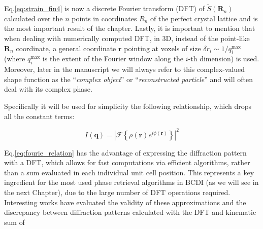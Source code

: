 
Eq.\ref{eq:strain_fin4} is now a discrete Fourier transform (DFT) of $\tilde{S}(\mathbf{R}_n)$ calculated over the $n$ 
points in coordinates $R_n$ of the perfect crystal lattice and is the most important result of the chapter. 
Lastly, it is important to mention that when dealing with numerically computed DFT, in 3D, instead of the point-like 
$\mathbf{R}_n$ coordinate, a general coordinate $\mathbf{r}$ pointing at voxels of size $\delta r_i \sim 1/q^\text{max}_i$ 
(where $q^\text{max}_i$ is the extent of the Fourier window along the $i$-th dimension) is used. Moreover, later in the manuscript we will always refer to this complex-valued 
shape function as the ``\textit{complex object}'' or ``\textit{reconstructed particle}'' and will often deal with its 
complex phase. 

Specifically it will be used for simplicity the following relationship, which drops all the constant terms: 

\begin{equation}
    I(\mathbf q) =  \left| \mathcal{F}\!\left\{ \rho(\mathbf{r}) e^{i \phi(\mathbf{r})} \right\} \right |^2
    \label{eq:fourie_relation}
\end{equation}

Eq.\ref{eq:fourie_relation} has the advantage of expressing the diffraction pattern with a DFT, which allows for 
fast computations via efficient algorithms, rather than a sum evaluated in each individual unit cell position. This 
represents a key ingredient for the most used phase retrieval algorithms in BCDI (as we will see in the next Chapter), 
due to the large number of DFT operations required. Interesting works have evaluated the validity of these approximations
\cite{Godard2021} and the discrepancy between diffraction patterns calculated with the DFT and kinematic sum \cite{Haag2013, Madsen2021}
of 

